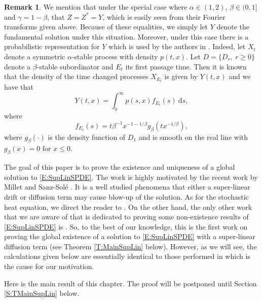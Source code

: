 \documentclass[a4paper,11pt]{article}
\numberwithin{equation}{section}
\theoremstyle{plain}
\theoremstyle{definition}
\newtheorem{remark}[theorem]{Remark}
\newcommand{\ud}{\ensuremath{\mathrm{d} }}
\numberwithin{NQ}{section}
\numberwithin{LQ}{section}
\numberwithin{ZQ}{section}
\begin{document}
\begin{remark}
  We mention that under the special case where $\alpha \in (1,2)$, $\beta \in (0,1]$ and $\gamma = 1
  - \beta$, that $Z = Z^* = Y$, which is easily seen from their Fourier transforms given above.
  Because of these equalities, we simply let $Y$ denote the fundamental solution under this
  situation. Moreover, under this case there is a probabilistic representation for $Y$ which is used
  by the authors in \cite{foondun.liu.ea:19:some, foondun.nane:17:asymptotic,
  mijena.nane:15:space-time, foondun.liu.ea:17:moment, mijena.nane:16:intermittence}.  Indeed, let
  $X_t$ denote a symmetric $\alpha$-stable process with density $p(t,x)$. Let $D=\{D_r, \: r \ge
  0\}$ denote a $\beta$-stable subordinator and $E_t$ its first passage time. Then it is known that
  the density of the time changed processes $X_{E_t}$ is given by $Y(t,x)$ and we have that
  \[
    Y(t,x) = \int_0^\infty p(s,x)f_{E_t}(s) \: \ud s,
  \]
  where
  \[
    f_{E_t}(s) = t \beta^{-1} x^{-1-1/\beta}g_{\beta}\left(tx^{-1/\beta} \right),
  \]
  where $g_\beta(\cdot)$ is the density function of $D_1$ and is smooth on the real line with
  $g_{\beta}(x) = 0$ for $x \le 0$.
\end{remark}

The goal of this paper is to prove the existence and uniqueness of a global solution to
\eqref{E:SupLinSPDE}. The work is highly motivated by the recent work by Millet and Sanz-Sol\'e
\cite{millet.sanz-sole:21:global}. It is a well studied phenomena that either a super-linear drift
or diffusion term may cause blow-up of the solution. As for the stochastic heat equation, we direct
the reader to \cite{foondun.nualart:21:osgood, mueller.sowers:93:blowup,
dalang.khoshnevisan.ea:19:global, bonder.groisman:09:global}. On the other hand, the only other work
that we are aware of that is dedicated to proving some non-existence results of \eqref{E:SupLinSPDE}
is \cite{asogwa.mijena.ea:20:blow-up}. So, to the best of our knowledge, this is the first work on
proving the global existence of a solution to \eqref{E:SupLinSPDE} with a super-linear diffusion
term (see Theorem \ref{T:MainSupLin} below). However, as we will see, the calculations given below
are essentially identical to those performed in \cite{millet.sanz-sole:21:global} which is the cause
for our motivation. \bigskip

Here is the main result of this chapter. The proof will be postponed until Section \ref{S:TMainSupLin} below.
\end{document}
